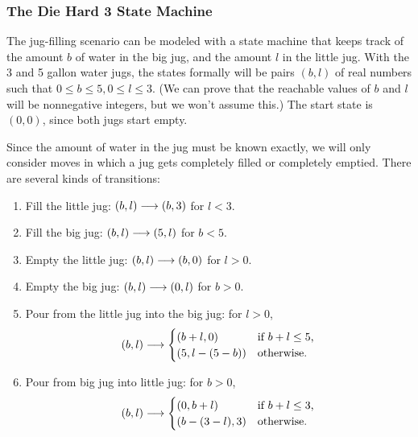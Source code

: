 \subsubsection{The Die Hard 3 State Machine}\label{diehard_machine}
The jug-filling scenario can be modeled with a state machine that keeps
track of the amount $b$ of water in the big jug, and the amount $l$
in the little jug.  With the 3 and 5 gallon water jugs, the states
formally will be pairs $(b,l)$ of real numbers such that $0 \leq b \leq
5, 0 \leq l \leq 3$.  (We can prove that the reachable values of $b$ and
$l$ will be nonnegative integers, but we won't assume this.)  The start
state is $(0,0)$, since both jugs start empty.

Since the amount of water in the jug must be known exactly, we will only
consider moves in which a jug gets completely filled or completely
emptied.  There are several kinds of transitions:
\begin{enumerate}

\item  Fill the little jug: $(b,l) \mathrel{\longrightarrow} (b,3)$ for $l < 3$.

\item  Fill the big jug: $(b,l) \mathrel{\longrightarrow} (5,l)$ for $b<5$.

\item  Empty the little jug: $(b,l) \mathrel{\longrightarrow} (b,0)$ for $l>0$.

\item  Empty the big jug: $(b,l) \mathrel{\longrightarrow} (0,l)$ for $b>0$.

\item  Pour from the little jug into the big jug: for $l>0$,
\begin{equation*}
(b,l) \mathrel{\longrightarrow}
\begin{cases}
(b+l, 0) & \text{if $b + l \le 5$,}\\
(5, l - (5 - b)) & \text{otherwise.}
\end{cases}
\end{equation*}

\item Pour from big jug into little jug: for $b>0$,
\begin{equation*}
(b,l) \mathrel{\longrightarrow}
\begin{cases}
(0, b+l) & \text{if $b + l \le 3$,}\\
(b - (3 -l), 3) & \text{otherwise.}
\end{cases}
\end{equation*}
\end{enumerate}

